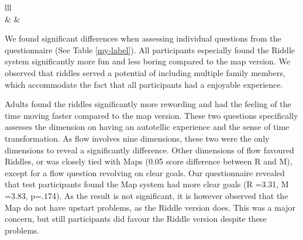 \begin{table}[h]
\begin{tabular}{lll}
                                                                                                                                                                                                                                         \\ \hline
{}                                                                   &                   &                     \\ \hline
{}                                                                                                                                      
\end{tabular}
\end{table}

We found significant differences when assessing individual questions from the questionnaire (See Table \ref{my-label}). All participants especially found the Riddle system significantly more fun and less boring compared to the map version. We observed that riddles served a potential of including multiple family members, which  accommodate the fact that all participants had a enjoyable experience. 

Adults found the riddles significantly more rewording and had the feeling of the time moving faster compared to the map version. These two questions specifically assesses the dimension on having an autotellic experience and the sense of time transformation. As flow involves nine dimensions, these two were the only dimensions to reveal a significantly difference. Other dimensions of flow favoured Riddles, or was closely tied with Maps (0.05 score difference between R and M), except for a flow question revolving on clear goals. Our questionnaire revealed that test participants found the Map system had more clear goals (R =3.31, M =3.83, p=.174). As the result is not significant, it is however observed that the Map do not have upstart problems, as the Riddle version does. This was a major concern, but still participants did favour the Riddle version despite these problems. 

